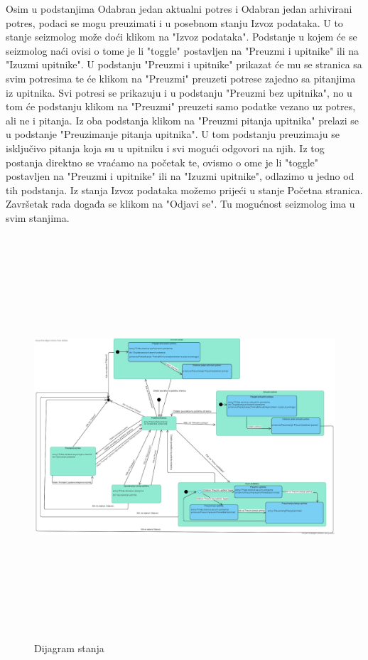 		Osim u podstanjima Odabran jedan aktualni potres i Odabran jedan arhivirani potres, podaci se mogu preuzimati i u posebnom stanju Izvoz podataka. U to stanje seizmolog može doći klikom na "Izvoz podataka". 
        Podstanje u kojem će se seizmolog naći ovisi o tome je li "toggle" postavljen na "Preuzmi i upitnike" ili na "Izuzmi upitnike". U podstanju "Preuzmi i upitnike" prikazat će mu se stranica sa svim potresima te će klikom na "Preuzmi" preuzeti potrese zajedno sa pitanjima iz upitnika.
        Svi potresi se prikazuju i u podstanju "Preuzmi bez upitnika", no u tom će podstanju klikom na "Preuzmi" preuzeti samo podatke vezano uz potres, ali ne i pitanja. Iz oba podstanja klikom na "Preuzmi pitanja upitnika" prelazi se u podstanje "Preuzimanje pitanja upitnika".
        U tom podstanju preuzimaju se isključivo pitanja koja su u upitniku i svi mogući odgovori na njih. Iz tog postanja direktno se vraćamo na početak te, ovismo o ome je li "toggle" postavljen na "Preuzmi i upitnike" ili na "Izuzmi upitnike", odlazimo u jedno od tih podstanja.
        Iz stanja Izvoz podataka možemo prijeći u stanje Početna stranica.
        Završetak rada događa se klikom na "Odjavi se". Tu mogućnost seizmolog ima u svim stanjima.
			
			
			
		\begin{figure}[H]
            \includegraphics[width=\textwidth, height=15cm]{slike/dijagramstanja.png}
            \caption{Dijagram stanja}
            \label{fig:uml_db} 
        \end{figure}
			
